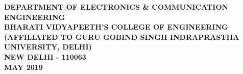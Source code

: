 \begin{center}
\vspace{-0.5cm}
\large{\textbf{DEPARTMENT OF ELECTRONICS & COMMUNICATION ENGINEERING\\ BHARATI VIDYAPEETH'S COLLEGE OF ENGINEERING\\
(AFFILIATED TO GURU GOBIND SINGH INDRAPRASTHA UNIVERSITY, DELHI)\\ NEW DELHI - 110063\\
\vspace{0.7cm}MAY 2019}}\\
\newpage
\end{center}






